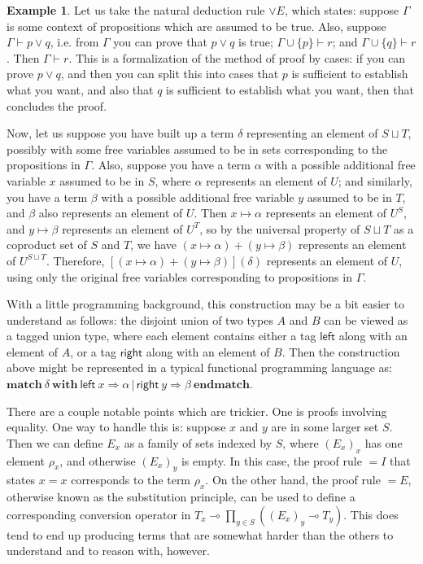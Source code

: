 \documentclass{article}
\theoremstyle{definition}
\newtheorem{example}{Example}
\begin{document}
	\begin{example}
		Let us take the natural deduction rule ${\lor} E$, which states: suppose $\Gamma$ is some context of propositions which are assumed to be true.  Also, suppose $\Gamma \vdash p \lor q$, i.e. from $\Gamma$ you can prove that $p\lor q$ is true; $\Gamma \cup \{ p \} \vdash r$; and $\Gamma \cup \{ q \} \vdash r$.  Then $\Gamma \vdash r$.  This is a formalization of the method of proof by cases: if you can prove $p \lor q$, and then you can split this into cases that $p$ is sufficient to establish what you want, and also that $q$ is sufficient to establish what you want, then that concludes the proof.
	
	Now, let us suppose you have built up a term $\delta$ representing an element of $S \sqcup T$, possibly with some free variables assumed to be in sets corresponding to the propositions in $\Gamma$.  Also, suppose you have a term $\alpha$ with a possible additional free variable $x$ assumed to be in $S$, where $\alpha$ represents an element of $U$; and similarly, you have a term $\beta$ with a possible additional free variable $y$ assumed to be in $T$, and $\beta$ also represents an element of $U$.  Then $x \mapsto \alpha$ represents an element of $U^S$, and $y \mapsto \beta$ represents an element of $U^T$, so by the universal property of $S \sqcup T$ as a coproduct set of $S$ and $T$, we have $(x \mapsto \alpha) + (y \mapsto \beta)$ represents an element of $U^{S\sqcup T}$.  Therefore, $[(x \mapsto \alpha) + (y \mapsto \beta)](\delta)$ represents an element of $U$, using only the original free variables corresponding to propositions in $\Gamma$.
	
	With a little programming background, this construction may be a bit easier to understand as follows: the disjoint union of two types $A$ and $B$ can be viewed as a tagged union type, where each element contains either a tag $\mathsf{left}$ along with an element of $A$, or a tag $\mathsf{right}$ along with an element of $B$.  Then the construction above might be represented in a typical functional programming language as: $\mathbf{match}~\delta~\mathbf{with}~\mathsf{left}~x \Rightarrow \alpha \,|\, \mathsf{right}~y \Rightarrow \beta~\mathbf{endmatch}$.
	\end{example}
	
	There are a couple notable points which are trickier.  One is proofs involving equality.  One way to handle this is: suppose $x$ and $y$ are in some larger set $S$.  Then we can define $E_x$ as a family of sets indexed by $S$, where $(E_x)_x$ has one element $\rho_x$, and otherwise $(E_x)_y$ is empty.  In this case, the proof rule ${=}I$ that states $x = x$ corresponds to the term $\rho_x$.  On the other hand, the proof rule ${=}E$, otherwise known as the substitution principle, can be used to define a corresponding conversion operator in $T_x \multimap \prod_{y\in S} ((E_x)_y \multimap T_y)$.  This does tend to end up producing terms that are somewhat harder than the others to understand and to reason with, however.
	
\end{document}
